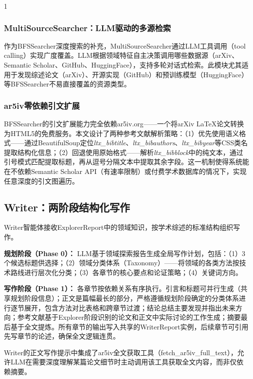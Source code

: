 \documentclass[10.5pt,compsoc,UTF8]{CjC}
\theoremstyle{mystyle}
\begin{document}
\begin{multicols}{1}

\subsubsection{MultiSourceSearcher：LLM驱动的多源检索}

作为BFSSearcher深度搜索的补充，MultiSourceSearcher通过LLM工具调用（tool calling）实现广度覆盖。LLM根据领域特征自主决策调用哪些数据源（arXiv、Semantic Scholar、GitHub、HuggingFace），支持多轮对话式检索。此模块尤其适用于发现综述论文（arXiv）、开源实现（GitHub）和预训练模型（HuggingFace）等BFSSearcher不易直接覆盖的资源类型。

\subsubsection{ar5iv零依赖引文扩展}

BFSSearcher的引文扩展能力完全依赖ar5iv.org——一个将arXiv LaTeX论文转换为HTML5的免费服务。本文设计了两种参考文献解析策略：（1）优先使用语义格式——通过BeautifulSoup定位\emph{ltx\_bibtitle}、\emph{ltx\_bibauthors}、\emph{ltx\_bibyear}等CSS类名提取结构化信息；（2）回退使用原始格式——解析\emph{ltx\_bibblock}中的纯文本，通过引号模式匹配提取标题，再从逗号分隔文本中提取其余字段。这一机制使得系统能在不依赖Semantic Scholar API（有速率限制）或付费学术数据库的情况下，实现任意深度的引文图遍历。

\subsection{Writer：两阶段结构化写作}

Writer智能体接收ExplorerReport中的领域知识，按学术综述的标准结构组织写作。

\textbf{规划阶段（Phase 0）：} LLM基于领域探索报告生成全局写作计划，包括：（1）3个候选标题供选择；（2）领域分类体系（Taxonomy）——将领域的各类方法按技术路线进行层次化分类；（3）各章节的核心要点和论证策略；（4）关键词方向。

\textbf{写作阶段（Phase 1）：} 各章节按依赖关系有序执行。引言和标题可并行生成（共享规划阶段信息）；正文是篇幅最长的部分，严格遵循规划阶段确定的分类体系进行逐节展开，包含方法对比表格和跨章节过渡；结论总结主要发现并指出未来方向；参考文献基于Explorer阶段识别的论文和正文中实际讨论的工作生成；摘要最后基于全文提炼。所有章节的输出写入共享的WriterReport实例，后续章节可引用先写章节的论述，确保全文逻辑连贯。

Writer的正文写作提示中集成了ar5iv全文获取工具（fetch\_ar5iv\_full\_text），允许LLM在需要深度理解某篇论文细节时主动调用该工具获取全文内容，而非仅依赖摘要。


\end{multicols}
\end{document}
